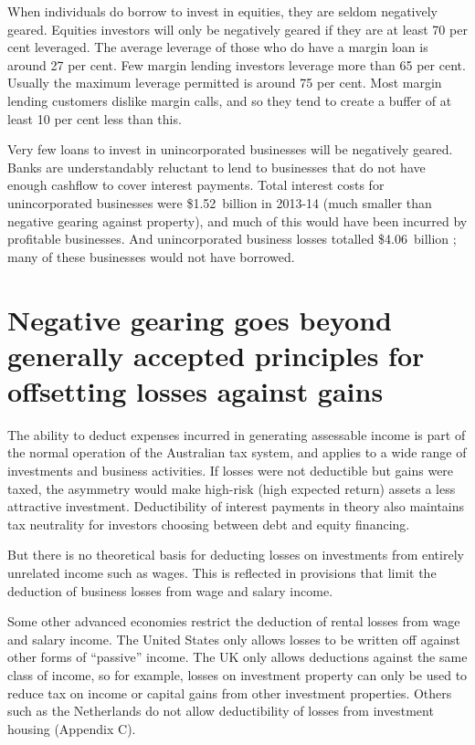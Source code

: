 \documentclass{grattan}\usepackage[]{graphicx}\usepackage[]{color}
\begin{document}
When individuals do borrow to invest in equities, they are seldom negatively geared. Equities investors will only be negatively geared if they are at least 70 per cent leveraged.  The average leverage of those who do have a margin loan is around 27 per cent.  Few margin lending investors leverage more than 65 per cent. Usually the maximum leverage permitted is around 75 per cent. Most margin lending customers dislike margin calls, and so they tend to create a buffer of at least 10 per cent less than this. 





Very few loans to invest in unincorporated businesses will be negatively geared. Banks are understandably reluctant to lend to businesses that do not have enough cashflow to cover interest payments. Total interest costs for unincorporated businesses were \$1.52~billion in 2013-14  (much smaller than negative gearing against property), and much of this would have been incurred by profitable businesses. And unincorporated business losses totalled \$4.06~billion ; many of these businesses would not have borrowed. 

\section{Negative gearing goes beyond generally accepted principles for offsetting losses against gains}
The ability to deduct expenses incurred in generating assessable income is part of the normal operation of the Australian tax system, and applies to a wide range of investments and business activities. If losses were not deductible but gains were taxed, the asymmetry would make high-risk (high expected return) assets a less attractive investment. Deductibility of interest payments in theory also maintains tax neutrality for investors choosing between debt and equity financing.  

But there is no theoretical basis for deducting losses on investments from entirely unrelated income such as wages. This is reflected in provisions that limit the deduction of business losses from wage and salary income. 

Some other advanced economies restrict the deduction of rental losses from wage and salary income. The United States only allows losses to be written off against other forms of ``passive'' income.  The UK only allows deductions against the same class of income, so for example, losses on investment property can only be used to reduce tax on income or capital gains from other investment properties. Others such as the Netherlands do not allow deductibility of losses from investment housing (Appendix C). 
\end{document}
